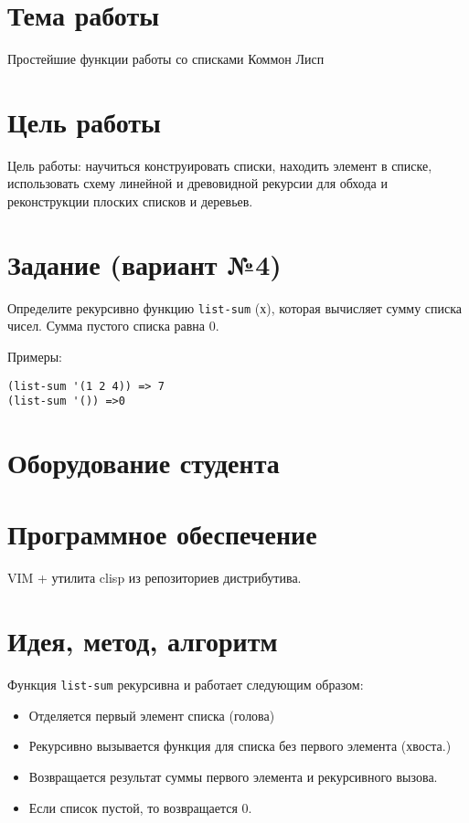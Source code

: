 \documentclass[12pt]{article}
\begin{document}

\section{Тема работы}
Простейшие функции работы со списками Коммон Лисп

\section{Цель работы}
Цель работы: научиться конструировать списки, находить элемент в списке,
использовать схему линейной и древовидной рекурсии для обхода и реконструкции
плоских списков и деревьев.

\section{Задание (вариант №4)}
\noindent
Определите рекурсивно функцию {\tt list-sum} (х), которая вычисляет сумму
списка чисел.
Сумма пустого списка равна 0.

Примеры:

\begin{lstlisting}
(list-sum '(1 2 4)) => 7
(list-sum '()) =>0
\end{lstlisting}

\section{Оборудование студента}
\mypc

\section{Программное обеспечение}
VIM + утилита clisp из репозиториев дистрибутива.

\section{Идея, метод, алгоритм}

Функция {\tt list-sum} рекурсивна и работает следующим образом:
\begin{itemize}
\setlength{\itemsep}{-1mm} %
\item Отделяется первый элемент списка (голова)
\item Рекурсивно вызывается функция для списка без первого элемента (хвоста.)
\item Возвращается результат суммы первого элемента и рекурсивного вызова.
\item Если список пустой, то возвращается 0.
\end{itemize}
\end{document}
